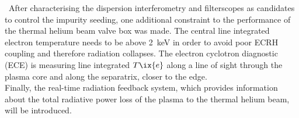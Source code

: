 %
        \,\newline%
        After characterising the dispersion interferometry and filterscopes as candidates to control the impurity seeding, one additional constraint to the performance of the thermal helium beam valve box was made. The central line integrated electron temperature needs to be above \SI{2}{\kilo\electronvolt} in order to avoid poor ECRH coupling and therefore radiation collapses. The electron cyclotron diagnostic (ECE) is measuring line integrated $T\ix{e}$ along a line of sight through the plasma core and along the separatrix, closer to the edge\cite{Krychowiak2021,Hirsch2019,Marushchenko2006}.\\%
        Finally, the real-time radiation feedback system, which provides information about the total radiative power loss of the plasma to the thermal helium beam, will be introduced.%
%

